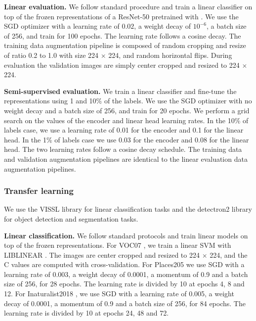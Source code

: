 \textbf{Linear evaluation.} We follow standard procedure and train a linear classifier on top of the frozen representations of a ResNet-50 pretrained with \algo. We use the SGD optimizer with a learning rate of $0.02$, a weight decay of $10^{-6}$, a batch size of 256, and train for 100 epochs. The learning rate follows a cosine decay. The training data augmentation pipeline is composed of random cropping and resize of ratio 0.2 to 1.0 with size 224 $\times$ 224, and random horizontal flips. During evaluation the validation images are simply center cropped and resized to 224 $\times$ 224.

\textbf{Semi-supervised evaluation.} We train a linear classifier and fine-tune the representations using 1 and 10\% of the labels. We use the SGD optimizer with no weight decay and a batch size of 256, and train for 20 epochs. We perform a grid search on the values of the encoder and linear head learning rates. In the 10\% of labels case, we use a learning rate of 0.01 for the encoder and 0.1 for the linear head. In the 1\% of labels case we use 0.03 for the encoder and 0.08 for the linear head. The two learning rates follow a cosine decay schedule. The training data and validation augmentation pipelines are identical to the linear evaluation data augmentation pipelines.

\subsubsection{Transfer learning} \label{app:transfer_other}

We use the VISSL library \cite{goyal2021vissl} for linear classification tasks and the detectron2 library \cite{wu2019detectron2} for object detection and segmentation tasks.

\textbf{Linear classification.} We follow standard protocols \cite{misra2020pirl, caron2020swav, zbontar2021barlow} and train linear models on top of the frozen representations. For VOC07 \cite{everingham2010voc}, we train a linear SVM with LIBLINEAR \cite{fan2008liblinear}. The images are center cropped and resized to 224 $\times$ 224, and the C values are computed with cross-validation. For Places205 \cite{zhou2014places} we use SGD with a learning rate of 0.003, a weight decay of 0.0001, a momentum of 0.9 and a batch size of 256, for 28 epochs. The learning rate is divided by 10 at epochs 4, 8 and 12. For Inaturalist2018 \cite{vanhorni2018naturalist}, we use SGD with a learning rate of 0.005, a weight decay of 0.0001, a momentum of 0.9 and a batch size of 256, for 84 epochs. The learning rate is divided by 10 at epochs 24, 48 and 72.

